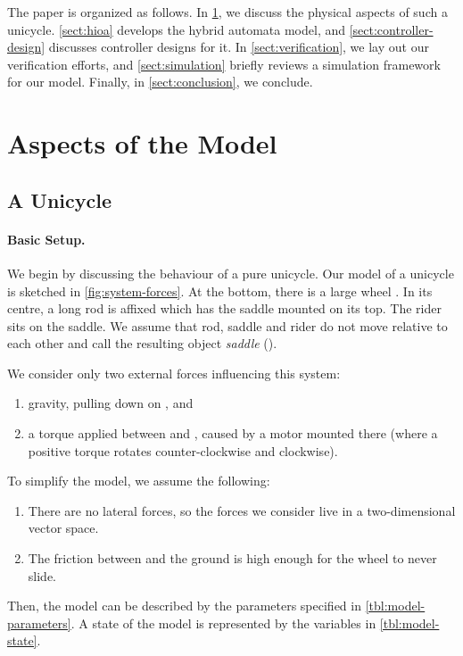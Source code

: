 \documentclass[copyright,submission]{eptcs}
\begin{document}
The paper is organized as follows.
In \cref{sect:model-aspects}, we discuss the physical aspects of such a unicycle. \cref{sect:hioa} develops the hybrid automata model, and  \cref{sect:controller-design} discusses  controller designs for it.
In \cref{sect:verification}, we lay out our verification efforts, and \cref{sect:simulation} briefly reviews a simulation framework for our model. Finally, in \cref{sect:conclusion}, we conclude.


\section{Aspects of the Model}\label{sect:model-aspects}

\subsection{A Unicycle}\label{sect:physics-summary}

\paragraph{Basic Setup.}
We begin by discussing the behaviour of a pure unicycle.
Our model of a unicycle is sketched in \cref{fig:system-forces}. At the
bottom, there is a large wheel . In its centre, a long rod is
affixed which has the saddle mounted on its top. The rider sits on the
saddle. We assume that rod, saddle and rider do not move relative to
each other and call the resulting object \emph{saddle} ().

We consider only two external forces influencing this system:
\begin{enumerate}
\item gravity, pulling down on , and
\item a torque  applied between  and , caused by a motor mounted there (where a positive torque rotates  counter-clockwise and  clockwise).
\end{enumerate}

To simplify the model, we assume the following:
\begin{enumerate}
\item There are no lateral forces, so the forces we consider live in a two-dimensional vector space.
\item The friction between  and the ground is high enough for the wheel to never slide.
\end{enumerate}

Then, the model can be described by the parameters specified
in \cref{tbl:model-parameters}. A state of the model is represented by
the variables in \cref{tbl:model-state}.
\end{document}
